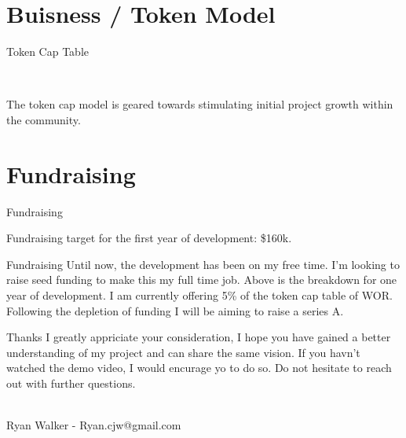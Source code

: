 \documentclass[final, ngerman, xcolor=pdftex, dvipsnames, table, aspectratio=169, 14pt]{beamer}
\begin{document}
\section{Buisness / Token Model}
\begin{frame}{Token Cap Table}

\begin{center}

\\
\end{center}
The token cap model is geared towards stimulating initial project growth within the community.
\end{frame}

\section{Fundraising}

\begin{frame}{Fundraising}
\begin{center}

Fundraising target for the first year of development: \$160k.
\end{center}

\end{frame}
\begin{frame}{Fundraising}
Until now, the development has been on my free time. I'm looking to raise seed funding to make this my full time job. Above is the breakdown for one year of development. I am currently offering 5\% of the token cap table of WOR. Following the depletion of funding I will be aiming to raise a series A.
\end{frame}

\begin{frame}{Thanks}
I greatly appriciate your consideration, I hope you have gained a better understanding of my project and can share the same vision. If you havn't watched the demo video, I would encurage yo to do so. Do not hesitate to reach out with further questions.
\\~\\
\begin{center}
Ryan Walker - Ryan.cjw@gmail.com
\end{center}
\end{frame}
\end{document}
